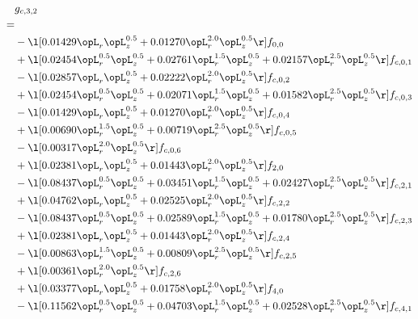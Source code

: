 \begin{alignat}{2} 
\label{eq:g_32_0} 
& g_{c,3,2} \nonumber \\ 
 = \\ 
& - \l[  0.01429 \opL_r \opL_z^{0.5} +  0.01270 \opL_r^{2.0} \opL_z^{0.5}  \r] f_{0,0} \nonumber \\ 
& + \l[  0.02454 \opL_r^{0.5} \opL_z^{0.5} +  0.02761 \opL_r^{1.5} \opL_z^{0.5} +  0.02157 \opL_r^{2.5} \opL_z^{0.5}  \r] f_{c,0,1} \nonumber \\ 
& - \l[  0.02857 \opL_r \opL_z^{0.5} +  0.02222 \opL_r^{2.0} \opL_z^{0.5}  \r] f_{c,0,2} \nonumber \\ 
& + \l[  0.02454 \opL_r^{0.5} \opL_z^{0.5} +  0.02071 \opL_r^{1.5} \opL_z^{0.5} +  0.01582 \opL_r^{2.5} \opL_z^{0.5}  \r] f_{c,0,3} \nonumber \\ 
& - \l[  0.01429 \opL_r \opL_z^{0.5} +  0.01270 \opL_r^{2.0} \opL_z^{0.5}  \r] f_{c,0,4} \nonumber \\ 
& + \l[  0.00690 \opL_r^{1.5} \opL_z^{0.5} +  0.00719 \opL_r^{2.5} \opL_z^{0.5}  \r] f_{c,0,5} \nonumber \\ 
& - \l[  0.00317 \opL_r^{2.0} \opL_z^{0.5}  \r] f_{c,0,6} \nonumber \\ 
& + \l[  0.02381 \opL_r \opL_z^{0.5} +  0.01443 \opL_r^{2.0} \opL_z^{0.5}  \r] f_{2,0} \nonumber \\ 
& - \l[  0.08437 \opL_r^{0.5} \opL_z^{0.5} +  0.03451 \opL_r^{1.5} \opL_z^{0.5} +  0.02427 \opL_r^{2.5} \opL_z^{0.5}  \r] f_{c,2,1} \nonumber \\ 
& + \l[  0.04762 \opL_r \opL_z^{0.5} +  0.02525 \opL_r^{2.0} \opL_z^{0.5}  \r] f_{c,2,2} \nonumber \\ 
& - \l[  0.08437 \opL_r^{0.5} \opL_z^{0.5} +  0.02589 \opL_r^{1.5} \opL_z^{0.5} +  0.01780 \opL_r^{2.5} \opL_z^{0.5}  \r] f_{c,2,3} \nonumber \\ 
& + \l[  0.02381 \opL_r \opL_z^{0.5} +  0.01443 \opL_r^{2.0} \opL_z^{0.5}  \r] f_{c,2,4} \nonumber \\ 
& - \l[  0.00863 \opL_r^{1.5} \opL_z^{0.5} +  0.00809 \opL_r^{2.5} \opL_z^{0.5}  \r] f_{c,2,5} \nonumber \\ 
& + \l[  0.00361 \opL_r^{2.0} \opL_z^{0.5}  \r] f_{c,2,6} \nonumber \\ 
& + \l[  0.03377 \opL_r \opL_z^{0.5} +  0.01758 \opL_r^{2.0} \opL_z^{0.5}  \r] f_{4,0} \nonumber \\ 
& - \l[  0.11562 \opL_r^{0.5} \opL_z^{0.5} +  0.04703 \opL_r^{1.5} \opL_z^{0.5} +  0.02528 \opL_r^{2.5} \opL_z^{0.5}  \r] f_{c,4,1} \nonumber \\ 

\end{alignat}
